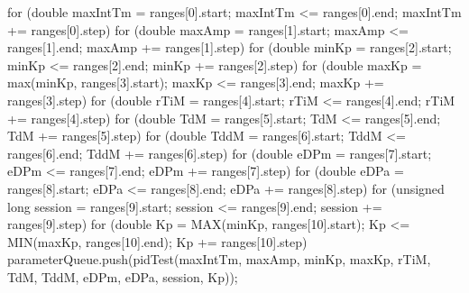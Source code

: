 \documentclass[a4paper,12pt]{report}
\begin{document}
\begin{lstlising}[language=C++]
{        for (double maxIntTm = ranges[0].start; maxIntTm <= ranges[0].end; maxIntTm += ranges[0].step)
        {
                for (double maxAmp = ranges[1].start; maxAmp <= ranges[1].end; maxAmp += ranges[1].step)
                {
                        for (double minKp = ranges[2].start; minKp <= ranges[2].end; minKp += ranges[2].step)
                        {
                                for (double maxKp = max(minKp, ranges[3].start);
                                         maxKp <= ranges[3].end; maxKp += ranges[3].step)
                                {
                                        for (double rTiM = ranges[4].start; rTiM <= ranges[4].end; rTiM += ranges[4].step)
                                        {
                                                for (double TdM = ranges[5].start; TdM <= ranges[5].end; TdM += ranges[5].step)
                                                {
                                                        for (double TddM = ranges[6].start; TddM <= ranges[6].end; TddM += ranges[6].step)
                                                        {
                                                                for (double eDPm = ranges[7].start; eDPm <= ranges[7].end; eDPm += ranges[7].step)
                                                                {
                                                                        for (double eDPa = ranges[8].start; eDPa <= ranges[8].end; eDPa += ranges[8].step)
                                                                        {
                                                                                for (unsigned long session = ranges[9].start; session <= ranges[9].end; session += ranges[9].step)
                                                                                {
                                                                                        for (double Kp = MAX(minKp, ranges[10].start);
                                                                                                 Kp <= MIN(maxKp, ranges[10].end); Kp += ranges[10].step)
                                                                                        {
                                                                                                parameterQueue.push(pidTest({maxIntTm, maxAmp, minKp, maxKp, rTiM, TdM, TddM, eDPm, eDPa, session, Kp}));
                                                                                        }
                                                                                }
                                                                        }
                                                                }
                                                        }
                                                }
                                        }
                                }
                        }
                }
        }

}
\end{lstlising}
\end{document}
